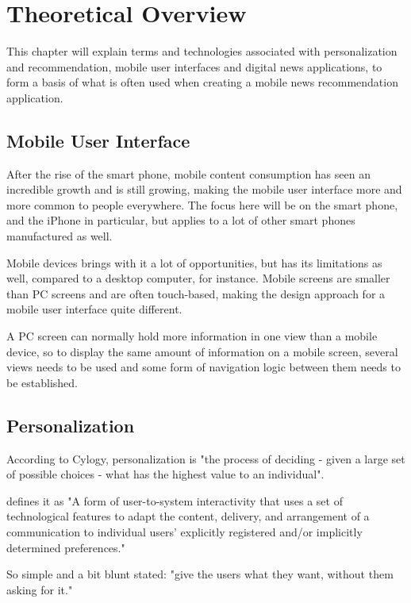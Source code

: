 \chapter{Theoretical Overview}
\label{chapter_theoretical_overview}
This chapter will explain terms and technologies associated with personalization and recommendation, mobile user interfaces and digital news applications, to form a basis of what is often used when creating a mobile news recommendation application.


\section{Mobile User Interface}
After the rise of the smart phone, mobile content consumption has seen an incredible growth and is still growing\cite{emarketer2012moretime}, making the mobile user interface more and more common to people everywhere. The focus here will be on the smart phone, and the iPhone in particular, but applies to a lot of other smart phones manufactured as well.

Mobile devices brings with it a lot of opportunities, but has its limitations as well, compared to a desktop computer, for instance. Mobile screens are smaller than PC screens and are often touch-based, making the design approach for a mobile user interface quite different.

A PC screen can normally hold more information in one view than a mobile device, so to display the same amount of information on a mobile screen, several views needs to be used and some form of navigation logic between them needs to be established.


\section{Personalization}

According to Cylogy, personalization is "the process of deciding - given a large set of possible choices - what has the highest value to an individual"\cite{personalization_overview}.

\cite{thurman2012future} defines it as "A form of user-to-system interactivity that uses a set of technological features to adapt the content, delivery, and arrangement of a communication to individual users’ explicitly registered and/or implicitly determined preferences."

So simple and a bit blunt stated: "give the users what they want, without them asking for it."

